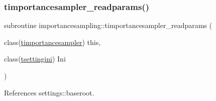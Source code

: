 \subsubsection{\texorpdfstring{timportancesampler\+\_\+readparams()}{timportancesampler\_readparams()}}
{\footnotesize\ttfamily subroutine importancesampling\+::timportancesampler\+\_\+readparams (\begin{DoxyParamCaption}\item[{class(\mbox{\hyperlink{structimportancesampling_1_1timportancesampler}{timportancesampler}})}]{this,  }\item[{class(\mbox{\hyperlink{structsettings_1_1tsettingini}{tsettingini}})}]{Ini }\end{DoxyParamCaption})\hspace{0.3cm}{\ttfamily [private]}}



References settings\+::baseroot.

